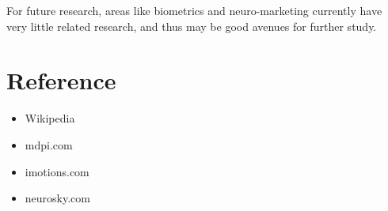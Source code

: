 \documentclass[12pt,a4paper]{article}
\begin{document}
For future research, areas like biometrics and neuro-marketing currently have very little related research, and thus may be good avenues for further study.

\clearpage 



\section{Reference}


\begin{itemize}
\item Wikipedia
\item mdpi.com
\item imotions.com
\item neurosky.com
\end{itemize}
\end{document}
